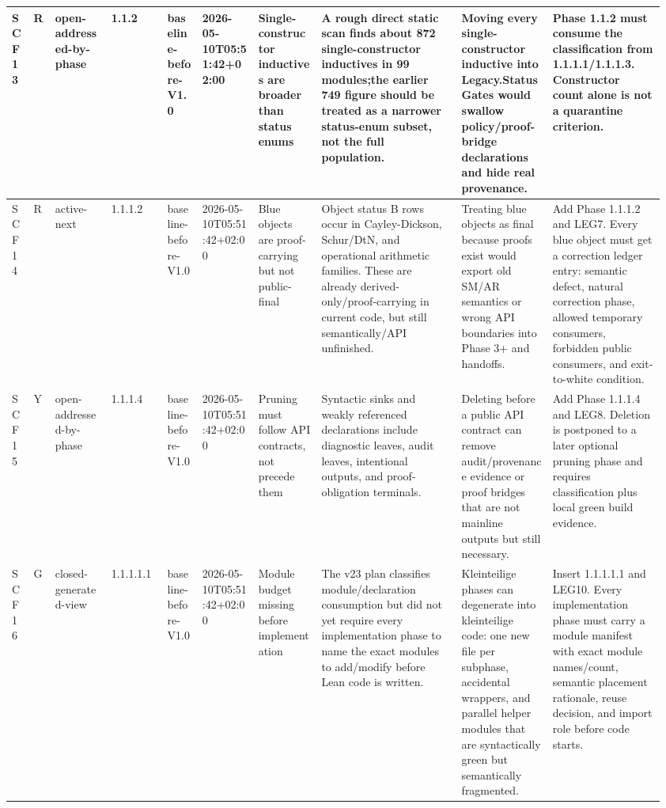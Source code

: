 \begin{longtable}{L{0.03\linewidth} L{0.026\linewidth} L{0.087\linewidth} L{0.085\linewidth} L{0.052\linewidth} L{0.085\linewidth} L{0.095\linewidth} L{0.205\linewidth} L{0.13\linewidth} L{0.165\linewidth}}
\hline
\addlinespace[0.24em]
SCF13 & R & open-addressed-by-phase & 1.1.2 & baseline-before-V1.0 & 2026-05-10T05:51:42+02:00 & Single-constructor inductives are broader than status enums & A rough direct static scan finds about 872 single-constructor inductives in 99 modules;\newline the earlier 749 figure should be treated as a narrower status-enum subset, not the full population. & Moving every single-constructor inductive into Legacy.StatusGates would swallow policy/\allowbreak{}proof-bridge declarations and hide real provenance. & Phase 1.1.2 must consume the classification from 1.1.1.1/\allowbreak{}1.1.1.3. Constructor count alone is not a quarantine criterion.\\
\hline
\addlinespace[0.24em]
SCF14 & R & active-next & 1.1.1.2 & baseline-before-V1.0 & 2026-05-10T05:51:42+02:00 & Blue objects are proof-carrying but not public-final & Object status B rows occur in Cayley-Dickson, Schur/\allowbreak{}DtN, and operational arithmetic families. These are already derived-only/\allowbreak{}proof-carrying in current code, but still semantically/\allowbreak{}API unfinished. & Treating blue objects as final because proofs exist would export old SM/\allowbreak{}AR semantics or wrong API boundaries into Phase 3+ and handoffs. & Add Phase 1.1.1.2 and LEG7. Every blue object must get a correction ledger entry: semantic defect, natural correction phase, allowed temporary consumers, forbidden public consumers, and exit-to-white condition.\\
\hline
\addlinespace[0.24em]
SCF15 & Y & open-addressed-by-phase & 1.1.1.4 & baseline-before-V1.0 & 2026-05-10T05:51:42+02:00 & Pruning must follow API contracts, not precede them & Syntactic sinks and weakly referenced declarations include diagnostic leaves, audit leaves, intentional outputs, and proof-obligation terminals. & Deleting before a public API contract can remove audit/\allowbreak{}provenance evidence or proof bridges that are not mainline outputs but still necessary. & Add Phase 1.1.1.4 and LEG8. Deletion is postponed to a later optional pruning phase and requires classification plus local green build evidence.\\
\hline
\addlinespace[0.24em]
SCF16 & G & closed-generated-view & 1.1.1.1.1 & baseline-before-V1.0 & 2026-05-10T05:51:42+02:00 & Module budget missing before implementation & The v23 plan classifies module/\allowbreak{}declaration consumption but did not yet require every implementation phase to name the exact modules to add/\allowbreak{}modify before Lean code is written. & Kleinteilige phases can degenerate into kleinteilige code: one new file per subphase, accidental wrappers, and parallel helper modules that are syntactically green but semantically fragmented. & Insert 1.1.1.1.1 and LEG10. Every implementation phase must carry a module manifest with exact module names/\allowbreak{}count, semantic placement rationale, reuse decision, and import role before code starts.\\

\end{longtable}
